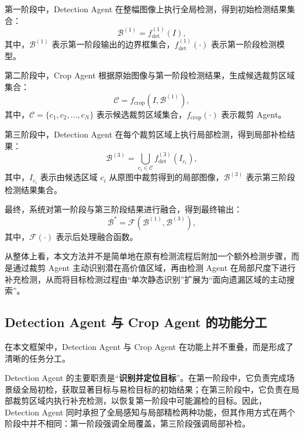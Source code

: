 第一阶段中，Detection Agent 在整幅图像上执行全局检测，得到初始检测结果集合：
\begin{equation}
\mathcal{B}^{(1)} = f_{\text{det}}^{(1)}(I),
\label{eq:stage1_detection}
\end{equation}
其中，$\mathcal{B}^{(1)}$ 表示第一阶段输出的边界框集合，$f_{\text{det}}^{(1)}(\cdot)$ 表示第一阶段检测模型。

第二阶段中，Crop Agent 根据原始图像与第一阶段检测结果，生成候选裁剪区域集合：
\begin{equation}
\mathcal{C} = f_{\text{crop}}(I, \mathcal{B}^{(1)}),
\label{eq:stage2_crop}
\end{equation}
其中，$\mathcal{C}=\{c_1,c_2,\dots,c_N\}$ 表示候选裁剪区域集合，$f_{\text{crop}}(\cdot)$ 表示裁剪 Agent。

第三阶段中，Detection Agent 在每个裁剪区域上执行局部检测，得到局部补检结果：
\begin{equation}
\mathcal{B}^{(3)} = \bigcup_{c_i \in \mathcal{C}} f_{\text{det}}^{(3)}(I_{c_i}),
\label{eq:stage3_detection}
\end{equation}
其中，$I_{c_i}$ 表示由候选区域 $c_i$ 从原图中裁剪得到的局部图像，$\mathcal{B}^{(3)}$ 表示第三阶段检测结果集合。

最终，系统对第一阶段与第三阶段结果进行融合，得到最终输出：
\begin{equation}
\mathcal{B}^{*} = \mathcal{F}\left(\mathcal{B}^{(1)}, \mathcal{B}^{(3)}\right),
\label{eq:final_fusion_general}
\end{equation}
其中，$\mathcal{F}(\cdot)$ 表示后处理融合函数。

从整体上看，本文方法并不是简单地在原有检测流程后附加一个额外检测步骤，而是通过裁剪 Agent 主动识别潜在高价值区域，再由检测 Agent 在局部尺度下进行补充检测，从而将目标检测过程由“单次静态识别”扩展为“面向遗漏区域的主动搜索”。

\subsection{Detection Agent 与 Crop Agent 的功能分工}
\label{subsec:agent_roles}

在本文框架中，Detection Agent 与 Crop Agent 在功能上并不重叠，而是形成了清晰的任务分工。

Detection Agent 的主要职责是“\textbf{识别并定位目标}”。在第一阶段中，它负责完成场景级全局初检，获取显著目标与易检目标的初始结果；在第三阶段中，它负责在局部裁剪区域内执行补充检测，以恢复第一阶段中可能漏检的目标。因此，Detection Agent 同时承担了全局感知与局部精检两种功能，但其作用方式在两个阶段中并不相同：第一阶段强调全局覆盖，第三阶段强调局部补检。

